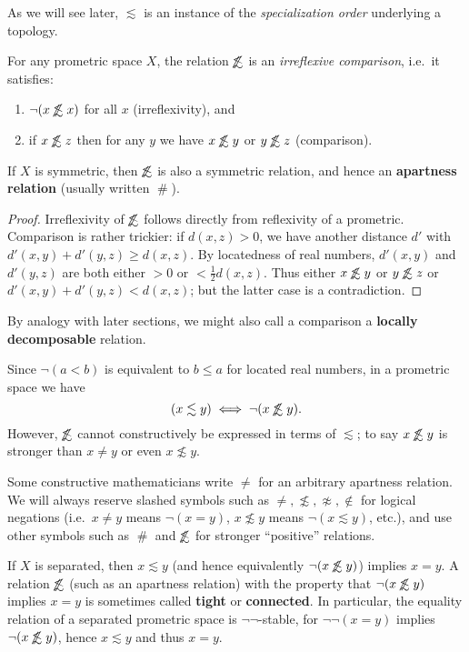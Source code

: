 \documentclass{article}
\def\apart{\mathrel{\#}}
\def\napprox{\not\approx}
\def\oapt{\mathrel{\!\not\,\not\lesssim}}
\def\leapx{\lesssim}
\begin{document}
As we will see later, $\leapx$ is an instance of the \emph{specialization order} underlying a topology.

\begin{thm}
  For any prometric space $X$, the relation $\oapt$ is an \emph{irreflexive comparison}, i.e.\ it satisfies:
  \begin{enumerate}
  \item $\neg(x\oapt x)$ for all $x$ (irreflexivity), and
  \item if $x\oapt z$ then for any $y$ we have $x\oapt y$ or $y\oapt z$ (comparison).
  \end{enumerate}
  If $X$ is symmetric, then $\oapt $ is also a symmetric relation, and hence an \textbf{apartness relation} (usually written $\apart$).
\end{thm}
\begin{proof}
  Irreflexivity of $\oapt $ follows directly from reflexivity of a prometric.
  Comparison is rather trickier: if $d(x,z)>0$, we have another distance $d'$ with $d'(x,y)+d'(y,z)\ge d(x,z)$.
  By locatedness of real numbers, $d'(x,y)$ and $d'(y,z)$ are both either $>0$ or $<\frac12 d(x,z)$.
  Thus either $x\oapt y$ or $y\oapt z$ or $d'(x,y)+d'(y,z) < d(x,z)$; but the latter case is a contradiction.
\end{proof}

By analogy with later sections, we might also call a comparison a \textbf{locally decomposable} relation.

Since $\neg(a<b)$ is equivalent to $b\le a$ for located real numbers, in a prometric space we have
\[ (x\leapx y) \iff \neg(x\oapt y). \]
However, $\oapt$ cannot constructively be expressed in terms of $\leapx$; to say $x\oapt y$ is stronger than $x\neq y$ or even $x\not\leapx y$.

\begin{warn}
  Some constructive mathematicians write $\neq$ for an arbitrary apartness relation.
  We will always reserve slashed symbols such as $\neq,\not\leapx,\napprox,\notin$ for logical negations (i.e.\ $x\neq y$ means $\neg(x=y)$, $x\not\leapx y$ means $\neg(x\leapx y)$, etc.), and use other symbols such as $\apart$ and $\oapt$ for stronger ``positive'' relations.
\end{warn}

If $X$ is separated, then $x\leapx y$ (and hence equivalently $\neg(x\oapt y)$) implies $x=y$.
A relation $\oapt$ (such as an apartness relation) with the property that $\neg(x\oapt y)$ implies $x=y$ is sometimes called \textbf{tight} or \textbf{connected}.
In particular, the equality relation of a separated prometric space is $\neg\neg$-stable, for $\neg\neg(x=y)$ implies $\neg(x\oapt y)$, hence $x\leapx y$ and thus $x=y$.
\end{document}
